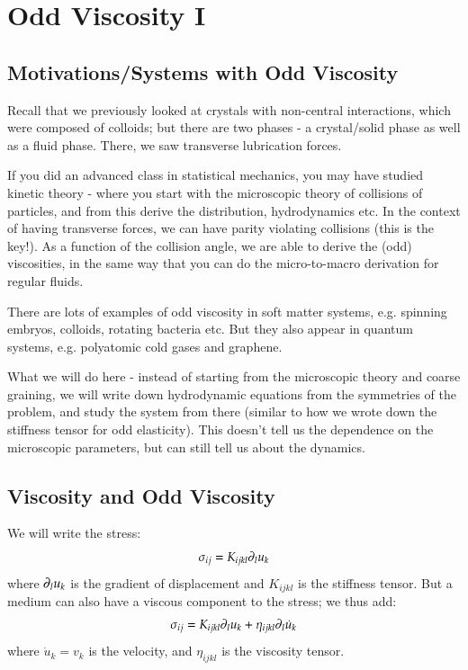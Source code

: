 \section{Odd Viscosity I}

\subsection{Motivations/Systems with Odd Viscosity}
Recall that we previously looked at crystals with non-central interactions, which were composed of colloids; but there are two phases - a crystal/solid phase as well as a fluid phase. There, we saw transverse lubrication forces.

If you did an advanced class in statistical mechanics, you may have studied kinetic theory - where you start with the microscopic theory of collisions of particles, and from this derive the distribution, hydrodynamics etc. In the context of having transverse forces, we can have parity violating collisions (this is the key!). As a function of the collision angle, we are able to derive the (odd) viscosities, in the same way that you can do the micro-to-macro derivation for regular fluids.

There are lots of examples of odd viscosity in soft matter systems, e.g. spinning embryos, colloids, rotating bacteria etc. But they also appear in quantum systems, e.g. polyatomic cold gases and graphene.

What we will do here - instead of starting from the microscopic theory and coarse graining, we will write down hydrodynamic equations from the symmetries of the problem, and study the system from there (similar to how we wrote down the stiffness tensor for odd elasticity). This doesn't tell us the dependence on the microscopic parameters, but can still tell us about the dynamics.

\subsection{Viscosity and Odd Viscosity}
We will write the stress:
\begin{equation}
    \sigma_{ij} = K_{ijkl}\partial_l u_k
\end{equation}
where $\partial_l u_k$ is the gradient of displacement and $K_{ijkl}$ is the stiffness tensor. But a medium can also have a viscous component to the stress; we thus add:
\begin{equation}
    \sigma_{ij} = K_{ijkl}\partial_l u_k + \eta_{ijkl}\partial_l \dot{u}_k
\end{equation}
where $\dot{u}_k = v_k$ is the velocity, and $\eta_{ijkl}$ is the viscosity tensor.

